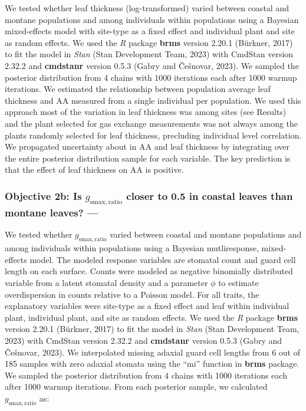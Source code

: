 \documentclass[
  letterpaper,
  DIV=11,
  numbers=noendperiod]{scrartcl}
\begin{document}
We tested whether leaf thickness (log-transformed) varied between
coastal and montane populations and among individuals within populations
using a Bayesian mixed-effects model with site-type as a fixed effect
and individual plant and site as random effects. We used the \emph{R}
package \textbf{brms} version 2.20.1 (Bürkner, 2017) to fit the model in
\emph{Stan} (Stan Development Team, 2023) with CmdStan version 2.32.2
and \textbf{cmdstanr} version 0.5.3 (Gabry and Češnovar, 2023). We
sampled the posterior distribution from 4 chains with 1000 iterations
each after 1000 warmup iterations. We estimated the relationship between
population average leaf thickness and \(\mathrm{AA}\) measured from a
single individual per population. We used this approach most of the
variation in leaf thickness was among sites (see Results) and the plant
selected for gas exchange measurements was not always among the plants
randomly selected for leaf thickness, precluding individual level
correlation. We propagated uncertainty about in \(\mathrm{AA}\) and leaf
thickness by integrating over the entire posterior distribution sample
for each variable. The key prediction is that the effect of leaf
thickness on \(\mathrm{AA}\) is positive.

\hypertarget{objective-2b-is-g_mathrmsmaxratio-closer-to-0.5-in-coastal-leaves-than-montane-leaves}{%
\subsubsection{\texorpdfstring{Objective 2b: Is
\(g_{\mathrm{smax,ratio}}\) closer to 0.5 in coastal leaves than montane
leaves?
---}{Objective 2b: Is g\_\{\textbackslash mathrm\{smax,ratio\}\} closer to 0.5 in coastal leaves than montane leaves? ---}}\label{objective-2b-is-g_mathrmsmaxratio-closer-to-0.5-in-coastal-leaves-than-montane-leaves}}

We tested whether \(g_\mathrm{smax,ratio}\) varied between coastal and
montane populations and among individuals within populations using a
Bayesian mutliresponse, mixed-effects model. The modeled response
variables are stomatal count and guard cell length on each surface.
Counts were modeled as negative binomially distributed variable from a
latent stomatal density and a parameter \(\phi\) to estimate
overdispersion in counts relative to a Poisson model. For all traits,
the explanatory variables were site-type as a fixed effect and leaf
within individual plant, individual plant, and site as random effects.
We used the \emph{R} package \textbf{brms} version 2.20.1 (Bürkner,
2017) to fit the model in \emph{Stan} (Stan Development Team, 2023) with
CmdStan version 2.32.2 and \textbf{cmdstanr} version 0.5.3 (Gabry and
Češnovar, 2023). We interpolated missing adaxial guard cell lengths from
6 out of 185 samples with zero adaxial stomata using the ``mi'' function
in \textbf{brms} package. We sampled the posterior distribution from 4
chains with 1000 iterations each after 1000 warmup iterations. From each
posterior sample, we calculated \(g_{\mathrm{smax,ratio}}\) as:
\end{document}
